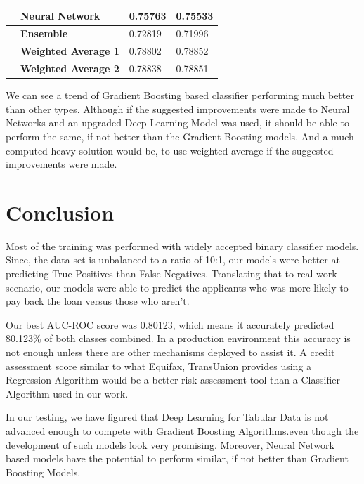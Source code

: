 \documentclass[sigconf, nonacm]{acmart}
\begin{document}
\begin{table}[t]
\begin{tabular}{@{}|c|l|l|l|@{}}
\multicolumn{1}{|l|}{\textbf{}} & \textbf{Neural Network}      & 0.75763 & 0.75533 \\ \midrule
\multicolumn{1}{|l|}{\textbf{}} & \textbf{Ensemble}            & 0.72819 & 0.71996 \\ \midrule
\multicolumn{1}{|l|}{\textbf{}}                & \textbf{Weighted Average 1}                  & 0.78802                 & 0.78852                \\ \midrule
\multicolumn{1}{|l|}{\textbf{}}                & \textbf{Weighted Average 2} & 0.78838                 & 0.78851                \\ \bottomrule
\end{tabular}
\end{table}

We can see a trend of Gradient Boosting based classifier performing much better than other types. Although if the suggested improvements were made to Neural Networks and an upgraded Deep Learning Model was used, it should be able to perform the same, if not better than the Gradient Boosting models. And a much computed heavy solution would be, to use weighted average if the suggested improvements were made.


\section{Conclusion}

Most of the training was performed with widely accepted binary classifier models. Since, the data-set is unbalanced to a ratio of 10:1, our
models were better at predicting True Positives than False Negatives. Translating that to real work scenario, our models were able to predict the applicants who was more likely to pay back the loan versus those who aren't.

Our best AUC-ROC score was 0.80123, which means it accurately predicted 80.123\% of both classes combined. In a production environment this accuracy is not enough unless there are other mechanisms deployed to assist it. A credit assessment score similar to what Equifax, TransUnion provides using a Regression Algorithm would be a better risk assessment tool than a Classifier Algorithm used in our work.

In our testing, we have figured that Deep Learning for Tabular Data is not advanced enough to compete with Gradient Boosting Algorithms.even though the development of such models look very promising. Moreover, Neural Network based models have the potential to perform similar, if not better than Gradient Boosting Models.
\end{document}

